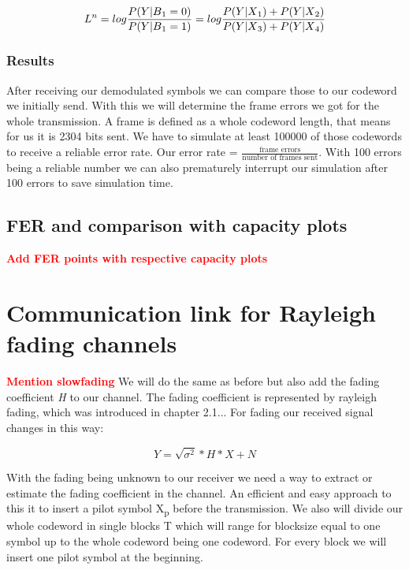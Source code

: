 \documentclass[12pt,oneside, reqno]{report}
\newcommand\boldred[1]{\textcolor{red}{\textbf{#1}}}
\begin{document}
\begin{equation}
\label{eq:llr}
L^n = log\frac{P(Y|B\textsubscript{1} = 0)}{P(Y|B\textsubscript{1} = 1)} = log\frac{P(Y|X\textsubscript{1})+P(Y|X\textsubscript{2})}{P(Y|X\textsubscript{3})+P(Y|X\textsubscript{4})} 
\end{equation} 



\subsection{Results}

After receiving our demodulated symbols we can compare those to our codeword we initially send. With this we will determine the frame errors we got for the whole transmission. A frame is defined as a whole codeword length, that means for us it is 2304 bits sent. We have to simulate at least 100000 of those codewords to receive a reliable error rate. Our error rate = $\frac{\textrm{frame errors}}{\textrm{number of frames sent}}$. With 100 errors being a reliable number we can also prematurely interrupt our simulation after 100 errors to save simulation time.


\section{FER and comparison with capacity plots}

\boldred{Add FER points with respective capacity plots}


\chapter{Communication link for Rayleigh fading channels}

\boldred{Mention slowfading}
We will do the same as before but also add the fading coefficient \textit{H} to our channel. The fading coefficient is represented by rayleigh fading, which was introduced in chapter 2.1... For fading our received signal changes in this way:

\begin{equation}
\label{eq:fading}
Y= \sqrt{\sigma^2}*H*X + N
\end{equation}

With the fading being unknown to our receiver we need a way to extract or estimate the fading coefficient in the channel. An efficient and easy approach to this it to insert a pilot symbol X\textsubscript{p} before the transmission. We also will divide our whole codeword in single blocks T which will range for blocksize equal to one symbol up to the whole codeword being one codeword. For every block we will insert one pilot symbol at the beginning.
\end{document}
